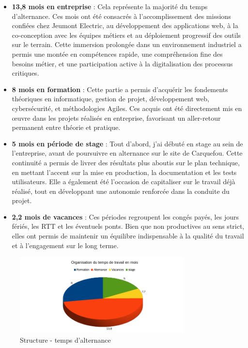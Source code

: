 \documentclass[11pt,a4paper]{article}
\begin{document}
\vspace{1em}
\begin{itemize}
    \item \textbf{13,8 mois en entreprise} : Cela représente la majorité du temps d’alternance. Ces mois ont été consacrés à l’accomplissement des missions confiées chez Jeumont Electric, au développement des applications web, à la co-conception avec les équipes métiers et au déploiement progressif des outils sur le terrain. Cette immersion prolongée dans un environnement industriel a permis une montée en compétences rapide, une compréhension fine des besoins métier, et une participation active à la digitalisation des processus critiques.

    \item \textbf{8 mois en formation} : Cette partie a permis d'acquérir les fondements théoriques en informatique, gestion de projet, développement web, cybersécurité, et méthodologies Agiles. Ces acquis ont été directement mis en œuvre dans les projets réalisés en entreprise, favorisant un aller-retour permanent entre théorie et pratique.

    \item \textbf{5 mois en période de stage} : Tout d’abord, j’ai débuté en stage au sein de l’entreprise, avant de poursuivre en alternance sur le site de Carquefou. Cette continuité a permis de livrer des résultats plus aboutis sur le plan technique, en mettant l’accent sur la mise en production, la documentation et les tests utilisateurs. Elle a également été l’occasion de capitaliser sur le travail déjà réalisé, tout en développant une autonomie renforcée dans la conduite du projet.

    \item \textbf{2,2 mois de vacances} : Ces périodes regroupent les congés payés, les jours fériés, les RTT et les éventuels ponts. Bien que non productives au sens strict, elles ont permis de maintenir un équilibre indispensable à la qualité du travail et à l’engagement sur le long terme.
\end{itemize}


\begin{figure}[H]
    \centering
    \includegraphics[width=0.8\textwidth]{../Images/organisation.png}
    \caption{Structure - temps d'alternance}
\end{figure} 
\end{document}

